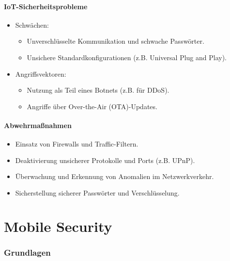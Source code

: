 \documentclass{article}
\begin{document}
\subsection{IoT-Sicherheitsprobleme}
\begin{itemize}
    \item Schwächen:
    \begin{itemize}
        \item Unverschlüsselte Kommunikation und schwache Passwörter.
        \item Unsichere Standardkonfigurationen (z.B. Universal Plug and Play).
    \end{itemize}
    \item Angriffsvektoren:
    \begin{itemize}
        \item Nutzung als Teil eines Botnets (z.B. für DDoS).
        \item Angriffe über Over-the-Air (OTA)-Updates.
    \end{itemize}
\end{itemize}

\subsection{Abwehrmaßnahmen}
\begin{itemize}
    \item Einsatz von Firewalls und Traffic-Filtern.
    \item Deaktivierung unsicherer Protokolle und Ports (z.B. UPnP).
    \item Überwachung und Erkennung von Anomalien im Netzwerkverkehr.
    \item Sicherstellung sicherer Passwörter und Verschlüsselung.
\end{itemize}





\part{Mobile Security}
\section{Grundlagen}
\end{document}
